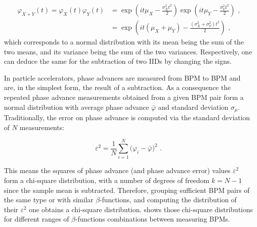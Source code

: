 \begin{equation}
    \begin{aligned}
        \varphi_{X+Y}(t) = \varphi_{X}(t) \varphi_{Y}(t) &= \exp \left( it \mu_{X} - \frac{\sigma_{X}^2 t^2}{2} \right) \exp \left(it \mu_{Y} - \frac{\sigma_{Y}^2 t^2}{2} \right)  \text{ ,} \\
                                                         &= \exp \left( it \left( \mu_{X} + \mu_{Y} \right) - \frac{\left( \sigma_{X}^2 + \sigma_{Y}^2 \right) t^2}{2} \right)  \text{ ,}
    \end{aligned}
\end{equation}
which corresponds to a normal distribution with its mean being the sum of the two means, and its variance being the sum of the two variances.
Respectively, one can deduce the same for the subtraction of two IIDs by changing the signs.

In particle accelerators, phase advances are measured from BPM to BPM and are, in the simplest form, the result of a subtraction.
As a consequence the repeated phase advance measurements obtained from a given BPM pair form a normal distribution with average phase advance \(\bar{\varphi}\) and standard deviation \(\sigma_{\mu}\).
Traditionally, the error on phase advance is computed via the standard deviation of \(N\) measurements:

\begin{equation}
    \varepsilon^2 = \frac{1}{N} \sum_{i=1}^{N}\big(\varphi_{i} - \bar{\varphi} \big)^2 \text{ .}
    \label{equation:phase_error_calculation}
\end{equation}

This means the squares of phase advance (and phase advance error) values \(\varepsilon^2\) form a chi-square distribution, with a number of degrees of freedom  \(k = N - 1\) since the sample mean is subtracted.
Therefore, grouping sufficient BPM pairs of the same type or with similar \(\beta\)-functions, and computing the distribution of their \(\varepsilon^2\) one obtains a chi-square distribution.
 shows those chi-square distributions for different ranges of \(\beta\)-functions combinations between measuring BPMs.

